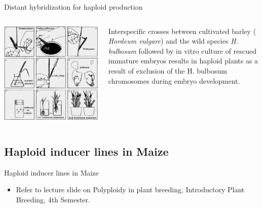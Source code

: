 \documentclass[
  ignorenonframetext,
  aspectratio=169]{beamer}
\providecommand{\tightlist}{%
  \setlength{\itemsep}{0pt}\setlength{\parskip}{0pt}}
\newcommand{\bcolumns}{\begin{columns}[T, onlytextwidth]}
\newcommand{\ecolumns}{\end{columns}}
\begin{document}
\begin{frame}{Distant hybridization for haploid production}
\bcolumns
{}

\begin{center}\includegraphics[width=0.82\linewidth]{../images/haploid_production_distant_hybridization} \end{center}


Interspecific crosses between cultivated barley ( \emph{Hordeum
vulgare}) and the wild species \emph{H. bulbosum} followed by in vitro
culture of rescued immature embryos results in haploid plants as a
result of exclusion of the H. bulbosum chromosomes during embryo
development.

\ecolumns
\end{frame}

\hypertarget{haploid-inducer-lines-in-maize}{%
\subsection{Haploid inducer lines in
Maize}\label{haploid-inducer-lines-in-maize}}

\begin{frame}{Haploid inducer lines in Maize}
\begin{itemize}
\tightlist
\item
  Refer to lecture slide on Polyploidy in plant breeding, Introductory
  Plant Breeding, 4th Semester.
\end{itemize}
\end{frame}
\end{document}
